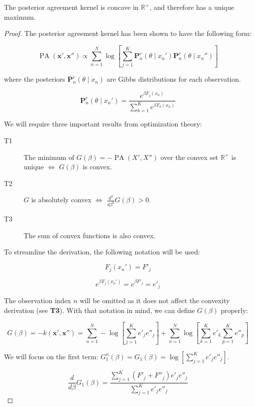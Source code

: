 \begin{theorem}
    The posterior agreement kernel is concave in $\mathbb{R}^+$, and therefore
    has a unique maximum.
\end{theorem}

\begin{proof}

The posterior agreement kernel has been shown to have the following form:

$$
\operatorname{PA}\left(\bm{x}', \bm{x}'' \right) \propto \sum_{n=1}^N \log \left[ \sum_{j=1}^K \mathbf{P}_n^c(\theta \mid x_n') \mathbf{P}_n^c(\theta \mid x_n'') \right]
$$

where the posteriors $\mathbf{P}_n^c(\theta \mid x_n)$ are Gibbs distributions for each observation.

$$
\mathbf{P}_n^c(\theta \mid x_n') = \frac{e^{\beta F_j(x_n)}}{\sum_{k=1}^K e^{\beta F_k(x_n)}}
$$

We will require three important results from optimization theory:

\begin{description}
    \item[T1] The minimum of $G(\beta) = -\operatorname{PA}(X', X'')$ over the convex set $\mathbb{R}^+$ is unique $\iff$ $G(\beta)$ is convex.
    \item[T2] $G$ is absolutely convex $\iff$ $\frac{d^2}{d \beta^2} G(\beta) > 0$.
    \item[T3] The sum of convex functions is also convex.
\end{description}


To streamline the derivation, the following notation will be used:

$$
F_j(x_n') = F'_j
$$

$$
e^{\beta F_j(x_n')} = e^{\beta F'_j} = e'_j
$$

The observation index $n$ will be omitted as it does not affect the convexity derivation (see \textbf{T3}). With that notation in mind, we can define $G(\beta)$ properly:

$$
G(\beta) = -k(\bm{x}', \bm{x}'') = \sum_{n=1}^N - \log \left [\sum_{j=1}^K e'_j e''_j \right] + \sum_{n=1}^N \log \left [ \sum_{k=1}^K e'_k \sum_{p=1}^K e''_p \right] 
$$

We will focus on the first term: $G^n_1(\beta) = G_1(\beta) = \log \left [\sum_{j=1}^K e'_j e''_j \right]$.

$$
\frac{d}{d \beta} G_1(\beta) = \frac{\sum_{j=1}^K (F'_j + F''_j)e'_j e''_j }{\sum_{j=1}^K e'_j e''_j }
$$


\end{proof}
